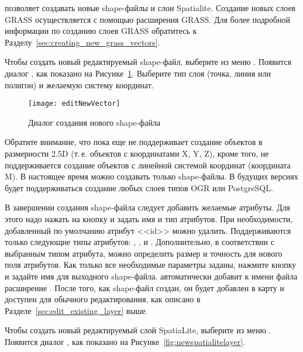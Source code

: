 \qg позволяет создавать новые shape-файлы и слои Spatialite. Создание новых
слоев GRASS осуществляется с помощью расширения GRASS. Для более подробной
информации по созданию слоев GRASS обратитесь к Разделу~\ref{sec:creating_new_grass_vectors}.

\label{sec:create shape}

Чтобы создать новый редактируемый shape-файл, выберите  \arrow
{} из меню
. Появится диалог , как
показано на Рисунке~\ref{fig:newvectorlayer}. Выберите тип слоя (точка,
линия или полигон) и желаемую систему координат.

\begin{figure}[ht]
   \centering
   \texttt{[image: editNewVector]}
   \caption{Диалог создания нового shape-файла \wincaption}\label{fig:newvectorlayer}
\end{figure}

Обратите внимание, что \qg пока еще не поддерживает создание объектов в
размерности 2.5D (т.\,е. объектов с координатами X, Y, Z), кроме того, не
поддерживается создание объектов с линейной системой координат (координата M).
В настоящее время можно создавать только shape-файлы. В будущих
версиях \qg будет поддерживаться создание любых слоев типов OGR или PostgreSQL.

В завершении создания shape-файла следует добавить желаемые атрибуты. Для
этого надо нажать на кнопку   и задать имя и тип атрибутов.
При необходимости, добавленный по умолчанию атрибут <<id>> можно удалить.
Поддерживаются только следующие типы атрибутов:  ,
, и .
Дополнительно, в соответствии с выбранным типом атрибута, можно определить
размер и точность для нового поля атрибутов. Как только все необходимые
параметры заданы, нажмите кнопку  и задайте имя для выходного
shape-файла. \qg автоматически добавит к имени файла расширение .
После того, как shape-файл создан, он будет добавлен в карту и доступен для
обычного редактирования, как описано в Разделе~\ref{sec:edit_existing_layer} выше.

\label{sec:create spatialite}

Чтобы создать новый редактируемый слой SpatiaLite, выберите 
\arrow {} из меню
. Появится диалог , как
показано на Рисунке~\ref{fig:newspatialitelayer}.

